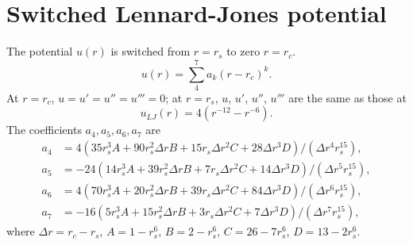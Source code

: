 \documentclass{article}
\begin{document}
\section{Switched Lennard-Jones potential}

The potential $u(r)$ is switched from $r = r_s$ to zero $r = r_c$.
\[
  u(r) = \sum_4^7 a_k (r - r_c)^k.
\]
At $r = r_c$, $u = u' = u'' = u''' = 0$;
at $r = r_s$, $u$, $u'$, $u''$, $u'''$ are the same as those at
\[
  u_{LJ}(r) = 4 (r^{-12} - r^{-6}).
\]
The coefficients $a_4, a_5, a_6, a_7$ are 
\begin{align}
  a_4 &= 4 (35 r_s^3 A + 90 r_s^2 \Delta r B + 15 r_s \Delta r^2 C + 28 \Delta r^3 D)/(\Delta r^4 r_s^15), \\
  a_5 &= -24 (14 r_s^3 A + 39 r_s^2 \Delta r B + 7 r_s \Delta r^2 C + 14 \Delta r^3 D)/(\Delta r^5 r_s^15), \\
  a_6 &= 4 (70 r_s^3 A + 20 r_s^2 \Delta r B + 39 r_s \Delta r^2 C + 84 \Delta r^3 D)/(\Delta r^6 r_s^15), \\
  a_7 & = -16 (5 r_s^3 A + 15 r_s^2 \Delta r B + 3 r_s \Delta r^2 C + 7 \Delta r^3 D)/(\Delta r^7 r_s^15),
\end{align}
where $\Delta r = r_c - r_s$, 
$A = 1 - r_s^6$,
$B = 2 - r_s^6$,
$C = 26 - 7 r_s^6$,
$D = 13 - 2 r_s^6$.
\end{document}

